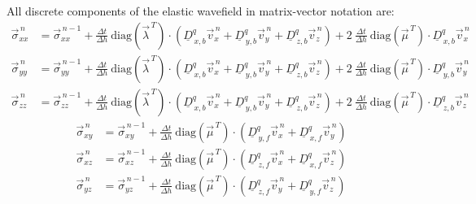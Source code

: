 \documentclass[pdftex,a4paper,parskip,listof=totoc,bibliography=totoc,onehalfspacing,12pt]{scrreprt}
\begin{document}
All discrete components of the elastic wavefield in matrix-vector notation are: 
\begin{align*}
	\vec{\sigma}_{xx}^{\,n} &= \vec{\sigma}_{xx}^{\,n-1} + \frac{\Delta t}{\Delta h}~ \mathrm{diag} \left( \vec{\lambda}^{\,T} \right) \cdot \left( \underline{D}_{\,x,b}^q \vec{v}_x^{\,n} +\underline{D}_{\,y,b}^q \vec{v}_y^{\,n} + \underline{D}_{\,z,b}^q \vec{v}_z^{\,n} \right) + 2~ \frac{\Delta t}{\Delta h} ~\mathrm{diag} \left( \vec{\mu}^{\,T} \right) \cdot \underline{D}_{\,x,b}^q \vec{v}_x^{\,n}\\
	\vec{\sigma}_{yy}^{\,n} &= \vec{\sigma}_{yy}^{\,n-1} + \frac{\Delta t}{\Delta h}~ \mathrm{diag} \left( \vec{\lambda}^{\,T} \right) \cdot \left( \underline{D}_{\,x,b}^q \vec{v}_x^{\,n} +\underline{D}_{\,y,b}^q \vec{v}_y^{\,n} + \underline{D}_{\,z,b}^q \vec{v}_z^{\,n} \right) + 2~ \frac{\Delta t}{\Delta h} ~\mathrm{diag} \left( \vec{\mu}^{\,T} \right) \cdot \underline{D}_{\,y,b}^q \vec{v}_y^{\,n}\\
	\vec{\sigma}_{zz}^{\,n} &= \vec{\sigma}_{zz}^{\,n-1} + \frac{\Delta t}{\Delta h}~ \mathrm{diag} \left( \vec{\lambda}^{\,T} \right) \cdot \left( \underline{D}_{\,x,b}^q \vec{v}_x^{\,n} +\underline{D}_{\,y,b}^q \vec{v}_y^{\,n} + \underline{D}_{\,z,b}^q \vec{v}_z^{\,n} \right) + 2~ \frac{\Delta t}{\Delta h} ~\mathrm{diag} \left( \vec{\mu}^{\,T} \right) \cdot \underline{D}_{\,z,b}^q \vec{v}_z^{\,n}
\end{align*}
\begin{align*}
	\vec{\sigma}_{xy}^{\,n} &= \vec{\sigma}_{xy}^{\,n-1} + \frac{\Delta t}{\Delta h}~ \mathrm{diag} \left( \vec{\mu}^{\,T} \right) \cdot \left( \underline{D}_{\,y,f}^q \vec{v}_x^{\,n} + \underline{D}_{\,x,f}^q \vec{v}_y^{\,n} \right)\\
	\vec{\sigma}_{xz}^{\,n} &= \vec{\sigma}_{xz}^{\,n-1} + \frac{\Delta t}{\Delta h}~ \mathrm{diag} \left( \vec{\mu}^{\,T} \right) \cdot \left( \underline{D}_{\,z,f}^q \vec{v}_x^{\,n} + \underline{D}_{\,x,f}^q \vec{v}_z^{\,n} \right)\\
	\vec{\sigma}_{yz}^{\,n} &= \vec{\sigma}_{yz}^{\,n-1} + \frac{\Delta t}{\Delta h}~ \mathrm{diag} \left( \vec{\mu}^{\,T} \right) \cdot \left( \underline{D}_{\,z,f}^q \vec{v}_y^{\,n} + \underline{D}_{\,y,f}^q \vec{v}_z^{\,n} \right)
\end{align*}
\end{document}
